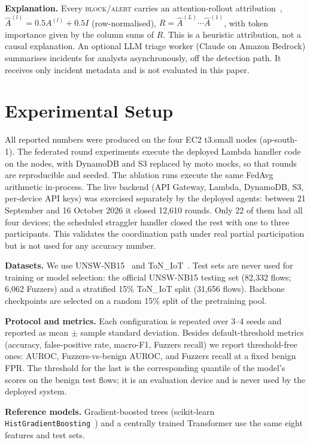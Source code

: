 \documentclass[conference]{IEEEtran}
\begin{document}
\textbf{Explanation.} Every \textsc{block}/\textsc{alert} carries an
attention-rollout attribution~\cite{abnar2020},
$\hat A^{(l)} = 0.5A^{(l)}+0.5I$ (row-normalised),
$R=\hat A^{(L)}\cdots\hat A^{(1)}$, with token importance given by the column
sums of $R$. This is a heuristic attribution, not a causal explanation.
An optional LLM triage worker (Claude on Amazon Bedrock) summarises
incidents for analysts asynchronously, off the detection path. It receives
only incident metadata and is not evaluated in this paper.

\section{Experimental Setup}
All reported numbers were produced on the four EC2 t3.small nodes
(ap-south-1). The federated round experiments execute the deployed Lambda
handler code on the nodes, with DynamoDB and S3 replaced by moto mocks, so that
rounds are reproducible and seeded. The ablation runs execute the same FedAvg
arithmetic in-process. The live backend (API Gateway, Lambda, DynamoDB, S3,
per-device API keys) was exercised separately by the deployed agents: between
21 September and 16 October 2026 it closed 12{,}610 rounds. Only 22 of them
had all four devices; the scheduled straggler handler closed the rest with one
to three participants. This validates the coordination path under real
partial participation but is not used for any accuracy number.

\textbf{Datasets.} We use UNSW-NB15~\cite{moustafa2015unsw} and
ToN\_IoT~\cite{ton_iot}. Test sets are never used for training or model
selection: the official UNSW-NB15 testing set (82{,}332 flows; 6{,}062
Fuzzers) and a stratified 15\% ToN\_IoT split (31{,}656 flows). Backbone
checkpoints are selected on a random 15\% split of the pretraining pool.

\textbf{Protocol and metrics.} Each configuration is repeated over 3--4 seeds
and reported as mean $\pm$ sample standard deviation. Besides
default-threshold metrics (accuracy, false-positive rate, macro-F1, Fuzzers
recall) we report threshold-free ones: AUROC, Fuzzers-vs-benign AUROC, and
Fuzzers recall at a fixed benign FPR. The threshold for the last is the
corresponding quantile of the model's scores on the benign test flows; it is
an evaluation device and is never used by the deployed system.

\textbf{Reference models.} Gradient-boosted trees (scikit-learn
\texttt{HistGradientBoosting}~\cite{pedregosa2011}) and a centrally trained
Transformer use the same eight features and test sets.
\end{document}
